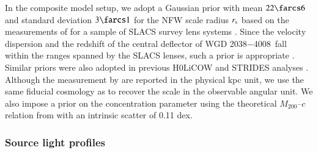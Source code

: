 \documentclass[longauth]{aa}
\newcommand{\lensname}{WGD 2038$-$4008}
\newcommand{\rmd}{{\rm d}}
\newcommand{\ajs}[1]{{{#1}}}
\begin{document}
%
%
In the composite model setup, we adopt a Gaussian prior with mean $22\farcs6$ and standard deviation $3\farcs1$ for the NFW scale radius $r_{\rm s}$ based on the measurements of \citet{Gavazzi07} for a sample of SLACS survey lens systems \citep{Bolton06}. Since the velocity dispersion and the redshift of the central deflector of \lensname\ fall within the ranges spanned by the SLACS lenses, such a prior is appropriate \citep{Treu06}. Similar priors were also adopted in previous H0LiCOW and STRIDES analyses \citep[e.g.][]{Wong17, Rusu17, Shajib20}. \ajs{Although the measurement by \citet{Gavazzi07} are reported in the physical kpc unit, we use the same fiducial cosmology as \citet{Gavazzi07} to recover the scale in the observable angular unit.} We also impose a prior on the concentration parameter using the theoretical $M_{200}$--$c$ relation from \citet{Diemer19} with an intrinsic scatter of 0.11 dex.

\subsubsection{Source light profiles} \label{sec:lenstronomy_source_profiles}
\end{document}
